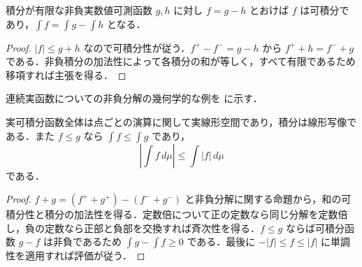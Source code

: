 \begin{prop}[実積分の非負分解による計算]
積分が有限な非負実数値可測函数 $g,h$ に対し $f=g-h$ とおけば $f$ は可積分であり，$\int f=\int g-\int h$ となる．
\end{prop}
\begin{proof}
$|f|\leq g+h$ なので可積分性が従う．$f^+-f^-=g-h$ から $f^++h=f^-+g$ である．非負積分の加法性によって各積分の和が等しく，すべて有限であるため移項すれば主張を得る．
\end{proof}
連続実函数についての非負分解の幾何学的な例を  に示す．
\begin{prop}[実積分の線形性と評価]
実可積分函数全体は点ごとの演算に関して実線形空間であり，積分は線形写像である．また $f\leq g$ なら $\int f\leq\int g$ であり，
\[
 \left|\int f\,d\mu\right|\leq\int|f|\,d\mu
\]
である．
\end{prop}
\begin{proof}
$f+g=(f^++g^+)-(f^-+g^-)$ と非負分解に関する命題から，和の可積分性と積分の加法性を得る．定数倍について正の定数なら同じ分解を定数倍し，負の定数なら正部と負部を交換すれば斉次性を得る．$f\leq g$ ならば可積分函数 $g-f$ は非負であるため $\int g-\int f\geq0$ である．最後に $-|f|\leq f\leq |f|$ に単調性を適用すれば評価が従う．
\end{proof}
